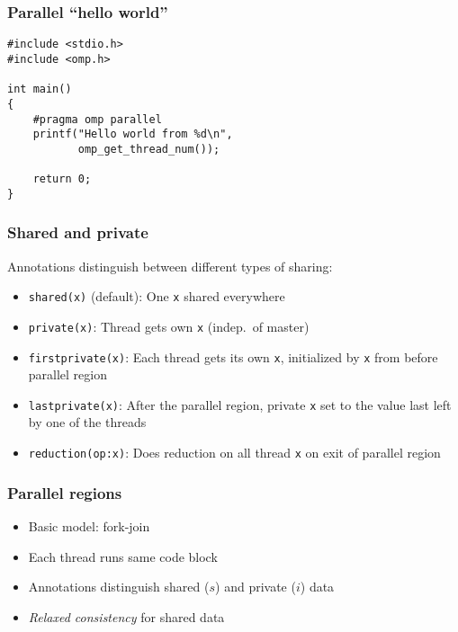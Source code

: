 \documentclass{beamer}
\begin{document}
\begin{frame}[fragile]
  \frametitle{Parallel ``hello world''}

\begin{lstlisting}
#include <stdio.h>
#include <omp.h>

int main()
{
    #pragma omp parallel
    printf("Hello world from %d\n", 
           omp_get_thread_num());

    return 0;
}
\end{lstlisting}
\end{frame}


\begin{frame}
  \frametitle{Shared and private}

  Annotations distinguish between different types of sharing:
  \begin{itemize}
  \item {\tt shared(x)} (default): One {\tt x} shared everywhere
  \item {\tt private(x)}: Thread gets own {\tt x} (indep.~of master)
  \item {\tt firstprivate(x)}: Each thread gets its own {\tt x},
    initialized by {\tt x} from before parallel region
  \item {\tt lastprivate(x)}: After the parallel region, private
    {\tt x} set to the value last left by one of the threads
  \item {\tt reduction(op:x)}: Does reduction on all thread {\tt x}
    on exit of parallel region
  \end{itemize}
\end{frame}


\begin{frame}
  \frametitle{Parallel regions}

  \begin{center}
  \end{center}
  \begin{itemize}
  \item Basic model: fork-join 
  \item Each thread runs same code block
  \item Annotations distinguish shared ($s$) and private ($i$) data
  \item {\em Relaxed consistency} for shared data
  \end{itemize}

\end{frame}
\end{document}
